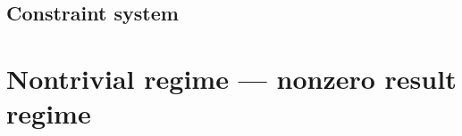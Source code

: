 \subsection{Constraint system}                                                   \label{alu: mul: nontrivial mul regime: zero result constraints}                     
\section{Nontrivial  regime --- nonzero result regime}                 \label{alu: mul: nontrivial mul regime: small exponent}                              
